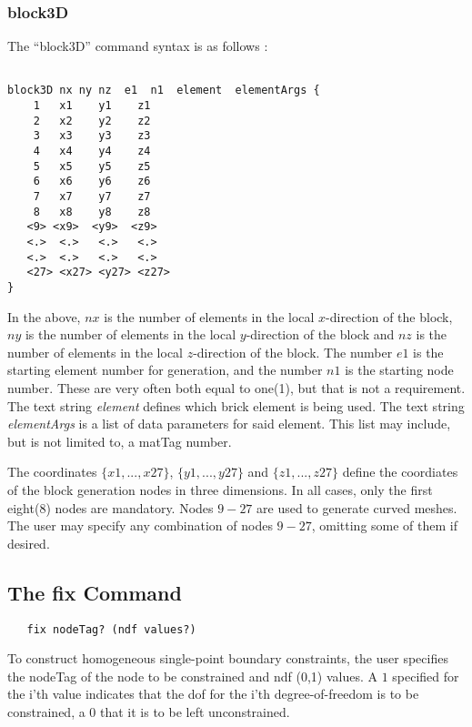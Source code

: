 \documentclass[12pt]{article}
\begin{document}
\subsubsection{block3D}
The ``block3D'' command syntax is as follows :
{\sf\small
\begin{verbatim}

block3D nx ny nz  e1  n1  element  elementArgs {
    1   x1    y1    z1 
    2   x2    y2    z2 
    3   x3    y3    z3 
    4   x4    y4    z4 
    5   x5    y5    z5 
    6   x6    y6    z6 
    7   x7    y7    z7 
    8   x8    y8    z8 
   <9> <x9>  <y9>  <z9>   
   <.>  <.>   <.>   <.>
   <.>  <.>   <.>   <.>
   <27> <x27> <y27> <z27>
}
\end{verbatim}

}
In the above, $nx$ is the number of elements in the local $x$-direction of
the block,
$ny$ is the number of elements in the local $y$-direction of
the block and
$nz$ is the number of elements in the local $z$-direction of
the block.
The number $e1$ is the starting element number for generation, and 
the number $n1$ is the starting node number.  These are very often both equal to 
one(1), but that is not a requirement.  The text string {\em element} defines 
which brick element is being used.  The text string {\em elementArgs}
is a list of data parameters for said element.  This list may include, but is
not limited to, a matTag number.

The coordinates $\{x1,...,x27\}$, $\{y1,...,y27\}$ and $\{z1,...,z27\}$
define the coordiates
of the block generation nodes in three dimensions.  
In all cases, only the first eight(8) 
nodes are mandatory. Nodes $9-27$ are used to generate curved meshes.
The user may specify any combination of nodes $9-27$, omitting some of them
if desired.




\subsection{The fix Command}
{\sf\small
\begin{verbatim}
   fix nodeTag? (ndf values?)
\end{verbatim}
}

To construct homogeneous single-point boundary constraints, the user
specifies the nodeTag of the node to be constrained and ndf (0,1)
values. A $1$ specified for the i'th value indicates that the dof for
the i'th degree-of-freedom is to be constrained, a $0$ that it is to be
left unconstrained.
\end{document}
